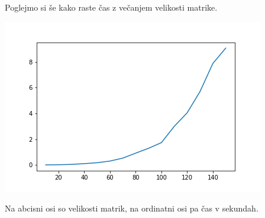 \documentclass[a4paper, 12pt]{article}
\begin{document}
\hfill \break
Poglejmo si še kako raste čas z večanjem velikosti matrike.

\includegraphics[width=\textwidth]{../slike/algorithm_time.png}

Na abcisni osi so velikosti matrik, na ordinatni osi pa čas v sekundah.
\end{document}
